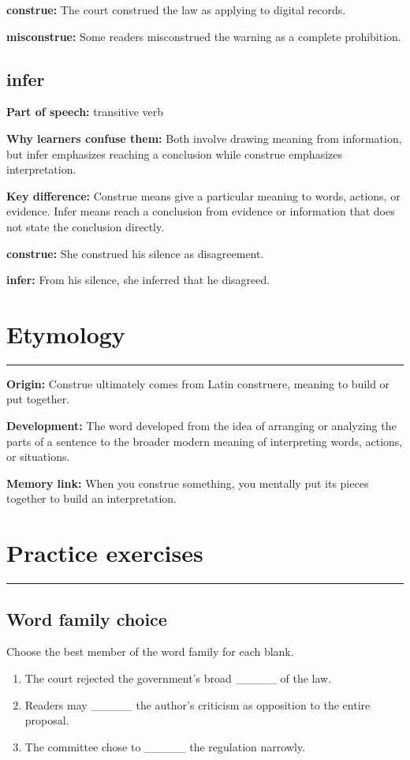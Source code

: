 \documentclass[11pt]{article}
\newcommand{\sectionrule}{\par\vspace{-0.5em}\noindent\textcolor{Accent}{\rule{\linewidth}{0.6pt}}\par}
\begin{document}
\textbf{construe:} The court construed the law as applying to digital records.

\textbf{misconstrue:} Some readers misconstrued the warning as a complete prohibition.

\subsection{infer}
\textbf{Part of speech:} transitive verb

\textbf{Why learners confuse them:} Both involve drawing meaning from information, but infer emphasizes reaching a conclusion while construe emphasizes interpretation.

\textbf{Key difference:} Construe means give a particular meaning to words, actions, or evidence. Infer means reach a conclusion from evidence or information that does not state the conclusion directly.

\textbf{construe:} She construed his silence as disagreement.

\textbf{infer:} From his silence, she inferred that he disagreed.

\section{Etymology}
\sectionrule
\textbf{Origin:} Construe ultimately comes from Latin construere, meaning to build or put together.

\textbf{Development:} The word developed from the idea of arranging or analyzing the parts of a sentence to the broader modern meaning of interpreting words, actions, or situations.

\textbf{Memory link:} When you construe something, you mentally put its pieces together to build an interpretation.

\section{Practice exercises}
\sectionrule
\subsection{Word family choice}
Choose the best member of the word family for each blank.

\begin{enumerate}
  \item The court rejected the government's broad \_\_\_\_\_ of the law.
  \item Readers may \_\_\_\_\_ the author's criticism as opposition to the entire proposal.
  \item The committee chose to \_\_\_\_\_ the regulation narrowly.
\end{enumerate}
\end{document}
